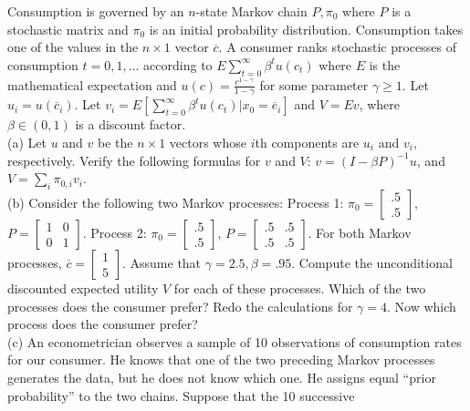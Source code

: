 \documentclass[12pt, letterpaper]{article}
\begin{document}
\begin{tcolorbox}[oddbox,title={Exercise 2.3 \quad Discounted Utility and Bayesian Model Choice}]
\begin{tcolorbox}[questionbox]
Consumption is governed by an $n$-state Markov chain $P,\pi_0$ where $P$ is a stochastic matrix and
$\pi_0$ is an initial probability distribution. Consumption takes one of the values in the $n\times1$
vector $\overline c$. A consumer ranks stochastic processes of consumption $t=0,1,\dots$ according to
$E\sum_{t=0}^\infty\beta^tu(c_t)$ where $E$ is the mathematical expectation and
$u(c)=\frac{c^{1-\gamma}}{1-\gamma}$ for some parameter $\gamma\ge1$. Let $u_i=u(\overline c_i)$. Let
$v_i=E[\sum_{t=0}^\infty\beta^tu(c_t)|x_0=\overline e_i]$ and $V=Ev$, where $\beta\in(0,1)$ is a
discount factor.\\[3pt]
(a) Let $u$ and $v$ be the $n\times1$ vectors whose $i$th components are $u_i$ and $v_i$,
respectively. Verify the following formulas for $v$ and $V$: $v=(I-\beta P)^{-1}u$, and
$V=\sum_i\pi_{0,i}v_i$.\\
(b) Consider the following two Markov processes:
Process 1: $\pi_0=\begin{bmatrix}.5\\.5\end{bmatrix}$, $P=\begin{bmatrix}1&0\\0&1\end{bmatrix}$.
Process 2: $\pi_0=\begin{bmatrix}.5\\.5\end{bmatrix}$, $P=\begin{bmatrix}.5&.5\\.5&.5\end{bmatrix}$.
For both Markov processes, $\overline c=\begin{bmatrix}1\\5\end{bmatrix}$. Assume that
$\gamma=2.5,\beta=.95$. Compute the unconditional discounted expected utility $V$ for each of these
processes. Which of the two processes does the consumer prefer? Redo the calculations for
$\gamma=4$. Now which process does the consumer prefer?\\
(c) An econometrician observes a sample of 10 observations of consumption rates for our consumer. He
knows that one of the two preceding Markov processes generates the data, but he does not know
which one. He assigns equal ``prior probability'' to the two chains. Suppose that the 10 successive

\end{tcolorbox}
\end{tcolorbox}
\end{document}
